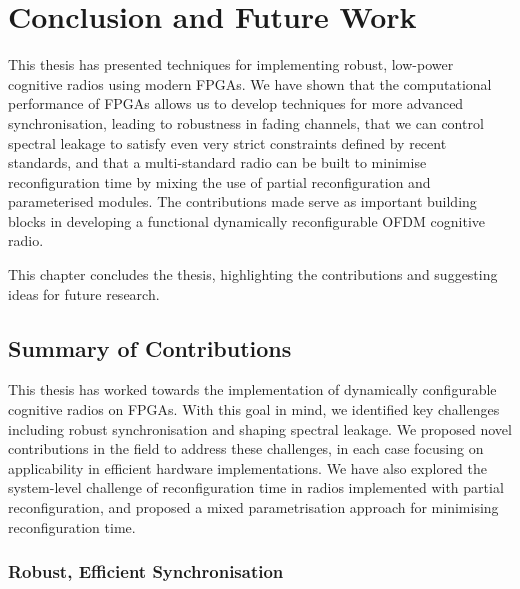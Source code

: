 \chapter{Conclusion and Future Work}
\label{chap:conclusion}
This thesis has presented techniques for implementing robust, low-power cognitive radios using modern FPGAs. We have shown that the computational performance of FPGAs allows us to develop techniques for more advanced synchronisation, leading to robustness in fading channels, that we can control spectral leakage to satisfy even very strict constraints defined by recent standards, and that a multi-standard radio can be built to minimise reconfiguration time by mixing the use of partial reconfiguration and parameterised modules. The contributions made serve as important building blocks in developing a functional dynamically reconfigurable OFDM cognitive radio.

This chapter concludes the thesis, highlighting the contributions and suggesting ideas for future research.

\section{Summary of Contributions}

This thesis has worked towards the implementation of dynamically configurable cognitive radios on FPGAs.
With this goal in mind, we identified key challenges including robust synchronisation and shaping spectral leakage.
We proposed novel contributions in the field to address these challenges, in each case focusing on applicability in efficient hardware implementations.
We have also explored the system-level challenge of reconfiguration time in radios implemented with partial reconfiguration, and proposed a mixed parametrisation approach for minimising reconfiguration time.

\subsection{Robust, Efficient Synchronisation}

